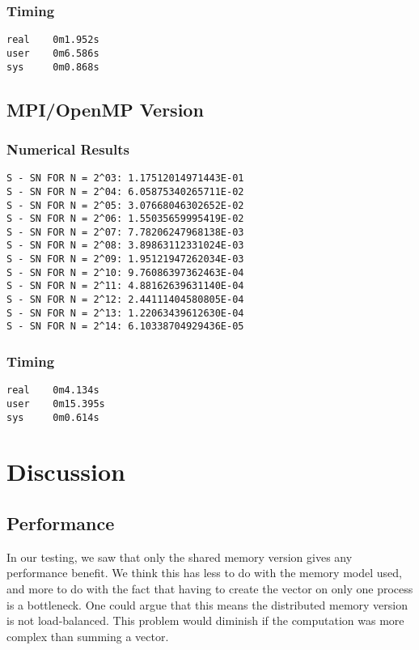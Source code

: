 \documentclass[a4paper, 12pt]{article}
\begin{document}
        \subsubsection{Timing} %
\begin{verbatim}
real    0m1.952s
user    0m6.586s
sys     0m0.868s
\end{verbatim}        

    \subsection{MPI/OpenMP Version} %
        \subsubsection{Numerical Results} %
        \begin{verbatim}
S - SN FOR N = 2^03: 1.17512014971443E-01
S - SN FOR N = 2^04: 6.05875340265711E-02
S - SN FOR N = 2^05: 3.07668046302652E-02
S - SN FOR N = 2^06: 1.55035659995419E-02
S - SN FOR N = 2^07: 7.78206247968138E-03
S - SN FOR N = 2^08: 3.89863112331024E-03
S - SN FOR N = 2^09: 1.95121947262034E-03
S - SN FOR N = 2^10: 9.76086397362463E-04
S - SN FOR N = 2^11: 4.88162639631140E-04
S - SN FOR N = 2^12: 2.44111404580805E-04
S - SN FOR N = 2^13: 1.22063439612630E-04
S - SN FOR N = 2^14: 6.10338704929436E-05
        \end{verbatim}
        \subsubsection{Timing} %
\begin{verbatim}
real    0m4.134s
user    0m15.395s
sys     0m0.614s
\end{verbatim}        

\section{Discussion} %
\label{sec:discussion}
    \subsection{Performance}
    In our testing, we saw that only the shared memory version gives any performance benefit. We think this has less to do with the memory model used, and more to do with the fact that having to create the vector on only one process is a bottleneck. One could argue that this means the distributed memory version is not load-balanced. This problem would diminish if the computation was more complex than summing a vector.
\end{document}
